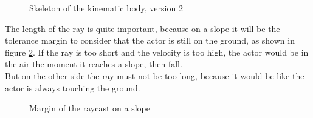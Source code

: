 \documentclass[10pt,a4paper]{article}
\begin{document}
\begin{figure}[H]
\centering
{}
\caption{Skeleton of the kinematic body, version 2}
\label{fig:kinematic_skeleton_2}
\end{figure}

The length of the ray is quite important, because on a slope it will be the tolerance margin to consider that the actor is still on the ground, as shown in figure \ref{fig:raycast_slope}. If the ray is too short and the velocity is too high, the actor would be in the air the moment it reaches a slope, then fall. \\
But on the other side the ray must not be too long, because it would be like the actor is always touching the ground.

\begin{figure}[H]
\centering
{}
\caption{Margin of the raycast on a slope}
\label{fig:raycast_slope}
\end{figure}
\end{document}
